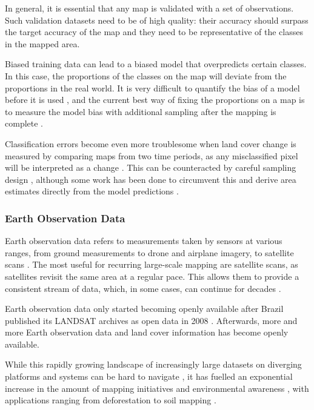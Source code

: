         In general, it is essential that any map is validated with a set of observations. Such validation datasets need to be of high quality: their accuracy should surpass the target accuracy of the map and they need to be representative of the classes in the mapped area.
    
        Biased training data can lead to a biased model that overpredicts certain classes. In this case, the proportions of the classes on the map will deviate from the proportions in the real world. It is very difficult to quantify the bias of a model before it is used \citep{stehman2013estimating}, and the current best way of fixing the proportions on a map is to measure the model bias with additional sampling after the mapping is complete \citep{stehman2014estimating}.

        Classification errors become even more troublesome when land cover change is measured by comparing maps from two time periods, as any misclassified pixel will be interpreted as a change \citep{olofsson2013making}. This can be counteracted by careful sampling design \citep{stehman2012impact,olofsson2014good}, although some work has been done to circumvent this and derive area estimates directly from the model predictions \citep{sales2022land,kleinewillinghofer2022unbiased,angelopoulos2023predictionpowered}.

    \subsubsection{Earth Observation Data}

        Earth observation data refers to measurements taken by sensors at various ranges, from ground measurements \citep{shahi2015novel} to drone \citep{tang2015precise} and airplane \citep{mastelic2020aerial} imagery, to satellite scans \citep{phiri2020sentinel}. The most useful for recurring large-scale mapping are satellite scans, as satellites revisit the same area at a regular pace. This allows them to provide a consistent stream of data, which, in some cases, can continue for decades \citep{xiong2020modis,wulder2022fifty}.

        Earth observation data only started becoming openly available after Brazil published its LANDSAT archives as open data in 2008 \citep{nature2008markets}. Afterwards, more and more Earth observation data and land cover information has become openly available. 
    
        While this rapidly growing landscape of increasingly large datasets on diverging platforms and systems can be hard to navigate \citep{wagemann2021a}, it has fuelled an exponential increase in the amount of mapping initiatives and environmental awareness \citep{wulder2022fifty}, with applications ranging from deforestation \citep{hansen2013high} to soil mapping \citep{hengl2017soilgrids250m}.
        
